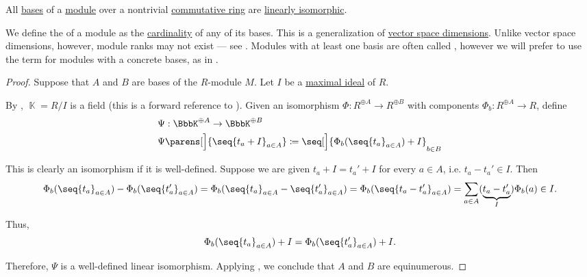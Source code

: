 \begin{proposition}\label{thm:commutative_module_rank}
  All \hyperref[def:hamel_basis]{bases} of a \hyperref[def:module]{module} over a nontrivial \hyperref[def:ring/commutative]{commutative ring} are \hyperref[def:semimodule/homomorphism]{linearly isomorphic}.

  We define the  of a module as the \hyperref[thm:cardinality_existence]{cardinality} of any of its bases. This is a generalization of \hyperref[thm:vector_space_dimension]{vector space dimensions}. Unlike vector space dimensions, however, module ranks may not exist --- see . Modules with at least one basis are often called , however we will prefer to use the term for modules with a concrete bases, as in .
\end{proposition}
\begin{proof}
  Suppose that \( A \) and \( B \) are bases of the \( R \)-module \( M \). Let \( I \) be a \hyperref[def:semiring_ideal/maximal]{maximal ideal} of \( R \).

  By , \( \BbbK = R / I \) is a field (this is a forward reference to ). Given an isomorphism \( \Phi: R^{\oplus A} \to R^{\oplus B} \) with components \( \Phi_b: R^{\oplus A} \to R \), define
  \begin{equation*}
    \begin{aligned}
      &\Psi: \BbbK^{\oplus A} \to \BbbK^{\oplus B} \\
      &\Psi\parens[\Big]{ \seq{ t_a + I }_{a \in A} } \coloneqq \seq[\Big]{ \Phi_b(\seq{ t_a }_{a \in A}) + I }_{b \in B}
    \end{aligned}
  \end{equation*}

  This is clearly an isomorphism if it is well-defined. Suppose we are given \( t_a + I = t_a' + I \) for every \( a \in A \), i.e. \( t_a - t_a' \in I \). Then
  \small
  \begin{equation*}
    \Phi_b(\seq{ t_a }_{a \in A}) - \Phi_b(\seq{ t_a' }_{a \in A})
    =
    \Phi_b(\seq{ t_a }_{a \in A} - \seq{ t_a' }_{a \in A})
    =
    \Phi_b(\seq{ t_a - t_a' }_{a \in A})
    =
    \sum_{a \in A} (\underbrace{ t_a - t_a' }_I) \Phi_b(a)
    \in
    I.
  \end{equation*}
  \normalsize

  Thus,
  \begin{equation*}
    \Phi_b(\seq{ t_a }_{a \in A}) + I = \Phi_b(\seq{ t_a' }_{a \in A}) + I.
  \end{equation*}

  Therefore, \( \Psi \) is a well-defined linear isomorphism. Applying , we conclude that \( A \) and \( B \) are equinumerous.
\end{proof}

